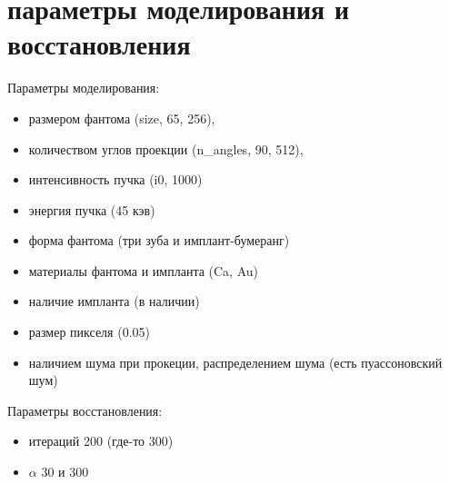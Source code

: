
\section{параметры моделирования и восстановления} \label{sect_2_3}
Параметры моделирования:
\begin{itemize}
  \item размером фантома (size, 65, 256),
  \item количеством углов проекции (n\_angles, 90, 512), 
  \item интенсивность пучка (i0, 1000)
  \item энергия пучка (45 кэв)
  \item форма фантома (три зуба и имплант-бумеранг)
  \item материалы фантома и импланта (Ca, Au)
  \item наличие импланта (в наличии)
  \item размер пикселя (0.05)
  \item наличием шума при прокеции, распределением шума (есть пуассоновский шум)
\end{itemize}

Параметры восстановления:
\begin{itemize}
  \item итераций 200 (где-то 300)
  \item $\alpha$ 30 и 300
\end{itemize}